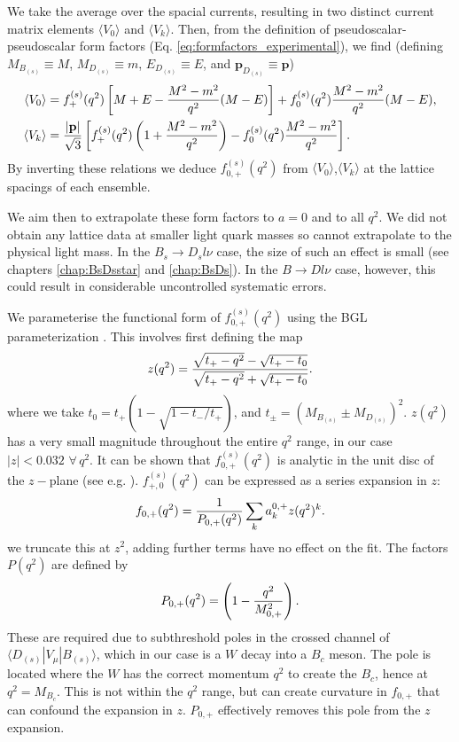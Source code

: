 We take the average over the spacial currents, resulting in two distinct current matrix elements $\langle V_0 \rangle$ and $\langle V_k \rangle$. Then, from the definition of pseudoscalar-pseudoscalar form factors (Eq. \eqref{eq:formfactors_experimental}), we find (defining $M_{B_{(s)}}\equiv M$, $M_{D_{(s)}}\equiv m$, $E_{D_{(s)}}\equiv E$, and ${\textbf{p}}_{D_{(s)}} \equiv {\textbf{p}}$)
\begin{align}
  \langle V_0 \rangle &= f^{(s)}_+(q^2) \left[ M + E - {M^2-m^2\over q^2}(M-E) \right] + f^{(s)}_0(q^2) {M^2-m^2\over q^2}(M-E), \\
  \langle V_k \rangle &= {|{\textbf{p}}|\over \sqrt{3}} \left[ f^{(s)}_+(q^2) \left( 1 + {M^2-m^2\over q^2} \right) - f^{(s)}_0(q^2) {M^2-m^2\over q^2} \right].
\end{align}
By inverting these relations we deduce $f^{(s)}_{0,+}(q^2)$ from $\langle V_0 \rangle$,$\langle V_k \rangle$ at the lattice spacings of each ensemble.

We aim then to extrapolate these form factors to $a=0$ and to all $q^2$. We did not obtain any lattice data at smaller light quark masses so cannot extrapolate to the physical light mass. In the $B_s\to D_sl\nu$ case, the size of such an effect is small (see chapters \ref{chap:BsDsstar} and \ref{chap:BsDs}). In the $B\to Dl\nu$ case, however, this could result in considerable uncontrolled systematic errors.

We parameterise the functional form of $f^{(s)}_{0,+}(q^2)$ using the BGL parameterization \cite{PhysRevD.79.013008}. This involves first defining the map
\begin{align}
	z(q^2) = {\sqrt{t_+ - q^2} - \sqrt{t_+ - t_0} \over \sqrt{t_+ - q^2} + \sqrt{t_+ - t_0} }.
\end{align}
where we take $t_0 = t_+( 1 - \sqrt{1 - t_-/t_+})$, and $t_{\pm} = (M_{B_{(s)}} \pm M_{D_{(s)}})^2$. $z(q^2)$ has a very small magnitude throughout the entire $q^2$ range, in our case $|z| < 0.032 \,\,\forall\,q^2$. It can be shown that $f_{0,+}^{(s)}(q^2)$ is analytic in the unit disc of the $z-$plane (see e.g. \cite{Hill:2006ub}). $f^{(s)}_{+,0}(q^2)$ can be expressed as a series expansion in $z$:
\begin{align}
	f_{0,+}(q^2) = {1\over P_{0,+}(q^2)} \sum_k a^{0,+}_k z(q^2)^k.
	\label{eq:zexpansion}
\end{align}
we truncate this at $z^2$, adding further terms have no effect on the fit. The factors $P(q^2)$ are defined by
\begin{align}
	P_{0,+}(q^2) = \left( 1 - {q^2\over M_{0,+}^2}\right).
\end{align}
These are required due to subthreshold poles in the crossed channel of $\langle D_{(s)} | V_{\mu} | B_{(s)} \rangle$, which in our case is a $W$ decay into a $B_c$ meson. The pole is located where the $W$ has the correct momentum $q^2$ to create the $B_c$, hence at $q^2=M_{B_c}$. This is not within the $q^2$ range, but can create curvature in $f_{0,+}$ that can confound the expansion in $z$. $P_{0,+}$ effectively removes this pole from the $z$ expansion.

